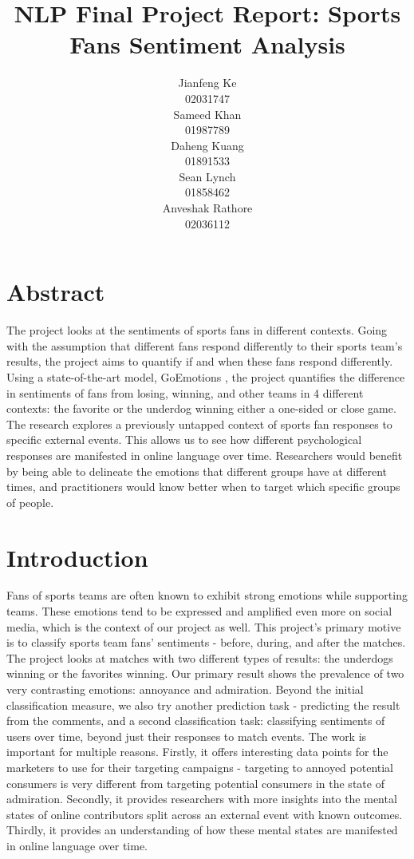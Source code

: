 \documentclass{article}
\title{NLP Final Project Report: Sports Fans Sentiment Analysis}
\author{
  \begin{tabular}{c}
    Jianfeng Ke \\
    02031747
  \end{tabular}
  \begin{tabular}{c}
    Sameed Khan \\
    01987789
  \end{tabular}
  \begin{tabular}{c}
    Daheng Kuang \\
    01891533
  \end{tabular}
  \begin{tabular}{c}
    Sean Lynch \\
    01858462
  \end{tabular}
  \begin{tabular}{c}
    Anveshak Rathore \\
    02036112
  \end{tabular}
}
\begin{document}
\maketitle

\section*{Abstract}
The project looks at the sentiments of sports fans in different contexts. Going with the assumption that different fans respond differently to their sports team's results, the project aims to quantify if and when these fans respond differently. Using a state-of-the-art model, GoEmotions \cite{demszky-etal-2020-goemotions}, the project quantifies the difference in sentiments of fans from losing, winning, and other teams in 4 different contexts: the favorite or the underdog winning either a one-sided or close game. The research explores a previously untapped context of sports fan responses to specific external events. This allows us to see how different psychological responses are manifested in online language over time. Researchers would benefit by being able to delineate the emotions that different groups have at different times, and practitioners would know better when to target which specific groups of people.

\section{Introduction}

Fans of sports teams are often known to exhibit strong emotions while supporting teams. These emotions tend to be expressed and amplified even more on social media, which is the context of our project as well. This project's primary motive is to classify sports team fans' sentiments - before, during, and after the matches. The project looks at matches with two different types of results: the underdogs winning or the favorites winning. Our primary result shows the prevalence of two very contrasting emotions: annoyance and admiration. Beyond the initial classification measure, we also try another prediction task - predicting the result from the comments, and a second classification task: classifying sentiments of users over time, beyond just their responses to match events. The work is important for multiple reasons. Firstly, it offers interesting data points for the marketers to use for their targeting campaigns - targeting to annoyed potential consumers is very different from targeting potential consumers in the state of admiration. Secondly, it provides researchers with more insights into the mental states of online contributors split across an external event with known outcomes. Thirdly, it provides an understanding of how these mental states are manifested in online language over time.
\end{document}
